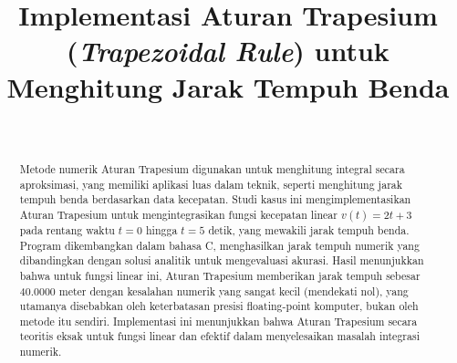 \documentclass[conference]{IEEEtran}
\begin{document}
\title{Implementasi Aturan Trapesium (\textit{Trapezoidal Rule}) untuk Menghitung Jarak Tempuh Benda}

\author{
\and
\\ %
\and
}

\maketitle

\begin{abstract}
Metode numerik Aturan Trapesium digunakan untuk menghitung integral secara aproksimasi, yang memiliki aplikasi luas dalam teknik, seperti menghitung jarak tempuh benda berdasarkan data kecepatan. Studi kasus ini mengimplementasikan Aturan Trapesium untuk mengintegrasikan fungsi kecepatan linear \( v(t) = 2t + 3 \) pada rentang waktu \( t = 0 \) hingga \( t = 5 \) detik, yang mewakili jarak tempuh benda. Program dikembangkan dalam bahasa C, menghasilkan jarak tempuh numerik yang dibandingkan dengan solusi analitik untuk mengevaluasi akurasi. Hasil menunjukkan bahwa untuk fungsi linear ini, Aturan Trapesium memberikan jarak tempuh sebesar 40.0000 meter dengan kesalahan numerik yang sangat kecil (mendekati nol), yang utamanya disebabkan oleh keterbatasan presisi floating-point komputer, bukan oleh metode itu sendiri. Implementasi ini menunjukkan bahwa Aturan Trapesium secara teoritis eksak untuk fungsi linear dan efektif dalam menyelesaikan masalah integrasi numerik.
\end{abstract}
\end{document}
